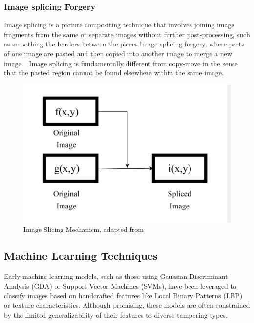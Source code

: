 \documentclass{ieeeaccess}
\begin{document}
 \subsubsection{Image splicing Forgery} 
 Image splicing is a picture compositing technique that involves joining image fragments from the same or separate images without further post-processing, such as smoothing the borders between the pieces.Image splicing forgery, where parts of one image are pasted and then copied into another image to merge a new image.~\cite{8456113} Image splicing is fundamentally different from copy-move in the sense that the pasted region cannot be found elsewhere within the same image.~\cite{8631389}
 
 \begin{figure}[h!]
 	\centering
 	\begin{minipage}{0.45\textwidth}
 		\centering
 		\includegraphics[width=\linewidth]{Slicing_Image.png}
 	\end{minipage}
 	\caption{Image Slicing Mechanism, adapted from \cite{8631389}}
 	\label{Slicing Image Mechanism}
 \end{figure}

\subsection{Machine Learning Techniques}

Early machine learning models, such as those using Gaussian Discriminant Analysis (GDA) or Support Vector Machines (SVMs), have been leveraged to classify images based on handcrafted features like Local Binary Patterns (LBP) or texture characteristics. Although promising, these models are often constrained by the limited generalizability of their features to diverse tampering types.
\end{document}
